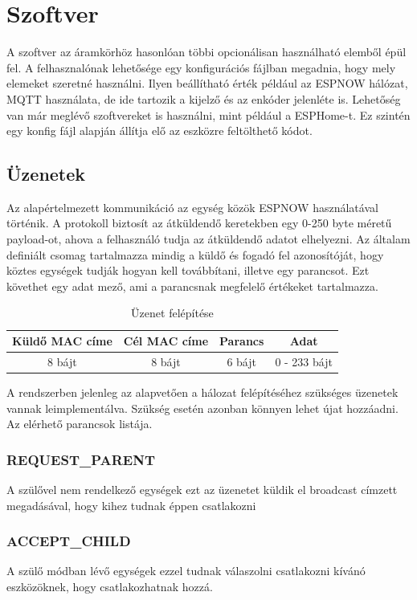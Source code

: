 \section{Szoftver}

A szoftver az áramkörhöz hasonlóan többi opcionálisan használható elemből épül fel. A felhasznalónak lehetősége egy konfigurációs fájlban megadnia, hogy mely elemeket szeretné használni. Ilyen beállítható érték például az ESPNOW hálózat, MQTT használata, de ide tartozik a kijelző és az enkóder jelenléte is. Lehetőség van már meglévő szoftvereket is használni, mint például a ESPHome-t. Ez szintén egy konfig fájl alapján állítja elő az eszközre feltölthető kódot.

\subsection{Üzenetek}
Az alapértelmezett kommunikáció az egység közök ESPNOW használatával történik. A protokoll biztosít az átküldendő keretekben egy 0-250 byte méretű payload-ot, ahova a felhasználó tudja az átküldendő adatot elhelyezni. Az általam definiált csomag tartalmazza mindig a küldő és fogadó fel azonosítóját, hogy köztes egységek tudják hogyan kell továbbítani, illetve egy parancsot. Ezt követhet egy adat mező, ami a parancsnak megfelelő értékeket tartalmazza.

\begin{table}[ht]
	\footnotesize
	\centering
	\begin{tabular}{ | c | c | c | c |}
		\toprule
		Küldő MAC címe & Cél MAC címe & Parancs & Adat \\
		\midrule
        8 bájt & 8 bájt & 6 bájt & 0 - 233 bájt \\
	\end{tabular}
	\caption{Üzenet felépítése}
	\label{tab:TabularExample}
\end{table}

A rendszerben jelenleg az alapvetően a hálozat felépítéséhez szükséges üzenetek vannak leimplementálva. Szükség esetén azonban könnyen lehet újat hozzáadni. Az elérhető parancsok listája.

\subsubsection{REQUEST\_PARENT}
A szülővel nem rendelkező egységek ezt az üzenetet küldik el broadcast címzett megadásával, hogy kihez tudnak éppen csatlakozni
\subsubsection{ACCEPT\_CHILD}
A szülő módban lévő egységek ezzel tudnak válaszolni csatlakozni kívánó eszközöknek, hogy csatlakozhatnak hozzá.
